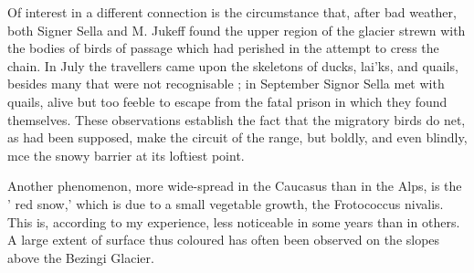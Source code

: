 \documentclass{article}
\begin{document}
Of interest in a different connection is the circumstance that, after bad weather, both Signer Sella and M. Jukeff found the upper region of the glacier strewn with the bodies of birds of passage which had perished in the attempt to cress the chain. In July the travellers came upon the skeletons of ducks, lai'ks, and quails, besides many that were not recognisable ; in September Signor Sella met with quails, alive but too feeble to escape from the fatal prison in which they found themselves. These observations establish the fact that the migratory birds do net, as had been supposed, make the circuit of the range, but boldly, and even blindly, mce the snowy barrier at its loftiest point.

Another phenomenon, more wide-spread in the Caucasus than in the Alps, is the ' red snow,' which is due to a small vegetable growth, the Frotococcus nivalis. This is, according to my experience, less noticeable in some years than in others. A large extent of surface thus coloured has often been observed on the slopes above the Bezingi Glacier.
\end{document}
